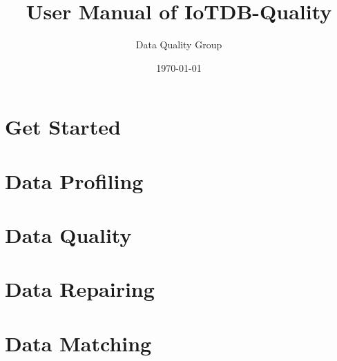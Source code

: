 \documentclass[11pt,color=green,table]{elegantbook}
\title{User Manual of IoTDB-Quality}
\author{Data Quality Group}
\institute{School of Software, Tsinghua University}
\date{\today}
\begin{document}
\maketitle
\tableofcontents
\mainmatter

\chapter{Get Started}




\chapter{Data Profiling}























\chapter{Data Quality}





\chapter{Data Repairing}





\chapter{Data Matching}









\end{document}
